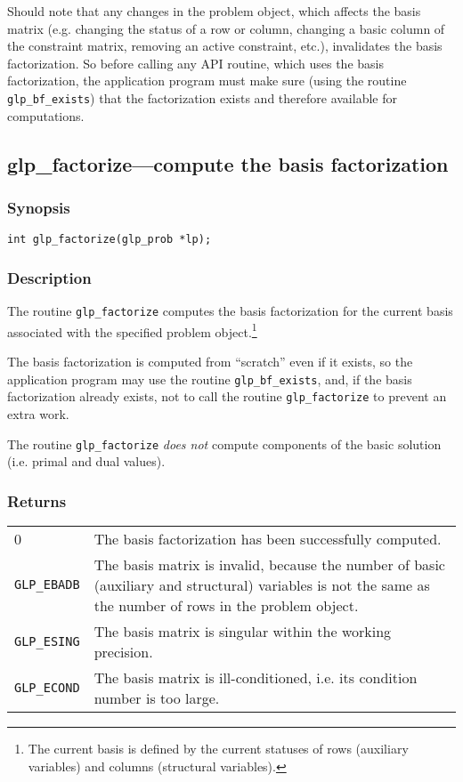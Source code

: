 Should note that any changes in the problem object, which affects the
basis matrix (e.g. changing the status of a row or column, changing
a basic column of the constraint matrix, removing an active constraint,
etc.), invalidates the basis factorization. So before calling any API
routine, which uses the basis factorization, the application program
must make sure (using the routine \verb|glp_bf_exists|) that the
factorization exists and therefore available for computations.


\newpage

\subsection{glp\_factorize---compute the basis factorization}

\subsubsection*{Synopsis}

\begin{verbatim}
int glp_factorize(glp_prob *lp);
\end{verbatim}

\subsubsection*{Description}

The routine \verb|glp_factorize| computes the basis factorization for
the current basis associated with the specified problem
object.\footnote{The current basis is defined by the current statuses
of rows (auxiliary variables) and columns (structural variables).}

The basis factorization is computed from ``scratch'' even if it exists,
so the application program may use the routine \verb|glp_bf_exists|,
and, if the basis factorization already exists, not to call the routine
\verb|glp_factorize| to prevent an extra work.

The routine \verb|glp_factorize| {\it does not} compute components of
the basic solution (i.e. primal and dual values).

\subsubsection*{Returns}

\begin{tabular}{@{}p{25mm}p{97.3mm}@{}}
0 & The basis factorization has been successfully computed.\\
\verb|GLP_EBADB| & The basis matrix is invalid, because the number of
basic (auxiliary and structural) variables is not the same as the number
of rows in the problem object.\\
\verb|GLP_ESING| & The basis matrix is singular within the working
precision.\\
\verb|GLP_ECOND| & The basis matrix is ill-conditioned, i.e. its
condition number is too large.\\
\end{tabular}

